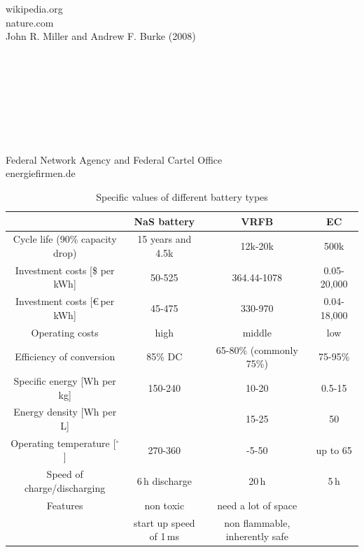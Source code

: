 \documentclass[12pt,a4paper]{article}
\begin{document}
\begin{parcolumns}[colwidths={1=2.5 cm, 2=10 cm, 3=2.5cm}]{3}
{\\ \\ \\ \\ \\ \\ \\ \\ \\ \\ \\ \\ \\ \\ \\ \\ \\ \\ \\ \\ \\ \\ \\ \\  wikipedia.org\\nature.com \\ John R. Miller and Andrew F. Burke (2008)\\
\\ \\ \\ \\\\ \\  \\ \\  Federal Network Agency and Federal Cartel Office \\energiefirmen.de
}

\end{parcolumns}
\begin{table}[H]
\centering
\caption{Specific values of different battery types}
\begin{tabular}{cccc}
\toprule
& NaS battery & VRFB & EC\\
\midrule
Cycle life (90\% capacity drop) & 15 years and 4.5k&12k-20k& 500k\\
Investment costs [\$ per kWh] & 50-525 & 364.44-1078&0.05-20,000\\
Investment costs [\euro \,per kWh]& 45-475 & 330-970& 0.04-18,000\\
Operating costs& high & middle & low\\
Efficiency of conversion & 85\% DC & 65-80\% (commonly 75\%) & 75-95\%\\
Specific energy [Wh per kg] & 150-240 & 10-20&0.5-15\\
Energy density [Wh per L] & & 15-25& 50\\
Operating temperature [$^\circ$]& 270-360& -5-50& up to 65 \\ 
Speed of charge/discharging &6\,h discharge &20\,h&5\,h\\
Features& non toxic & need a lot of space & \\
&start up speed of 1\,ms& non flammable, inherently safe &\\
\bottomrule
\end{tabular}
\end{table}
\end{document}

